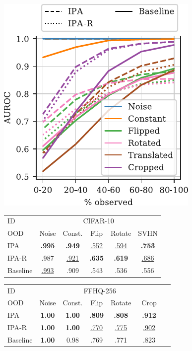 \begin{figure}[t]
    \footnotesize
  \centering
  \begin{minipage}{0.41\textwidth}

    \centering
    \includegraphics[scale=.8]{figs/cigcvae/ood-ffhq}

  \end{minipage}
  \begin{minipage}{.58\textwidth}

  \begin{tabular}{lccccc}
    \toprule
    ID & \multicolumn{5}{c}{CIFAR-10}  \\
    \cmidrule(r){2-6}
    OOD & Noise & Const. & Flip & Rotate & SVHN \\
    \midrule
    IPA      & \textbf{.995} & \textbf{.949} & \underline{.552} & \underline{.594} & \textbf{.753}    \\
    IPA-R    & .987         & \underline{.921}                  & \textbf{.635}    & \textbf{.619}    & \underline{.686} \\
    Baseline  & \underline{.993} & .909 & .543             & .536             & .556             \\
    \bottomrule
  \end{tabular}
  \newline
  \vspace*{.1cm}
  \newline
  \begin{tabular}{lcccccc}
    \toprule
    ID & \multicolumn{5}{c}{FFHQ-256}  \\
    \cmidrule(r){2-6}
    OOD         & Noise & Const. & Flip & Rotate & ~Crop~ \\
    \midrule
    IPA         & \textbf{1.00} & \textbf{1.00} & \textbf{.809}    & \textbf{.808}    & \textbf{.912}    \\
    IPA-R       & \textbf{1.00} & \textbf{1.00} & \underline{.770} & \underline{.775} & \underline{.902} \\
    Baseline     & \textbf{1.00} & 0.98  & .769 & .771             & .823             \\
    \bottomrule
  \end{tabular}


\end{minipage}
\end{figure}
